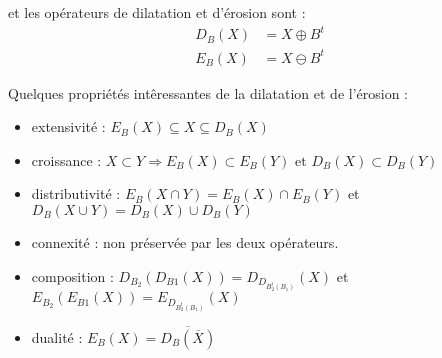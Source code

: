\documentclass[10pt,a4paper]{article}
\begin{document}
et les op\'{e}rateurs de dilatation et d'\'{e}rosion sont :
\begin{align*}	
	D_{B}\left(X\right) &= X\oplus B^t	\\
	E_{B}\left(X\right) &= X\ominus B^t
\end{align*}


Quelques propri\'{e}t\'{e}s int\^{e}ressantes de la dilatation et de l'\'{e}rosion : 
\begin{itemize}
	\item extensivit\'{e} : $E_B\left(X\right) \subseteq X \subseteq D_B\left(X\right)$ 
	\item croissance : $X\subset Y \Rightarrow E_B\left(X\right) \subset E_B\left(Y\right) \text{ et } D_B\left(X\right) \subset D_B\left(Y\right)$
	\item distributivit\'{e} : $E_B\left(X\cap Y\right) = E_B\left(X\right) \cap E_B\left(Y\right)$ et $D_B\left(X\cup Y\right) = D_B\left(X\right) \cup D_B\left(Y\right)$
	\item connexit\'{e} : non pr\'{e}serv\'{e}e par les deux op\'{e}rateurs.
	\item composition : $D_{B_2}\left(D_{B1}\left(X\right)\right) = D_{D_{B_{2}^{t}\left(B_1\right)}}\left(X\right)$ et  $E_{B_2}\left(E_{B1}\left(X\right)\right) = E_{D_{B_{2}^{t}\left(B_1\right)}}\left(X\right)$ 
	\item dualit\'{e} : $ E_B\left(X\right) = \overline{ D_B\left(\overline{X}\right)}$
\end{itemize}
\end{document}
